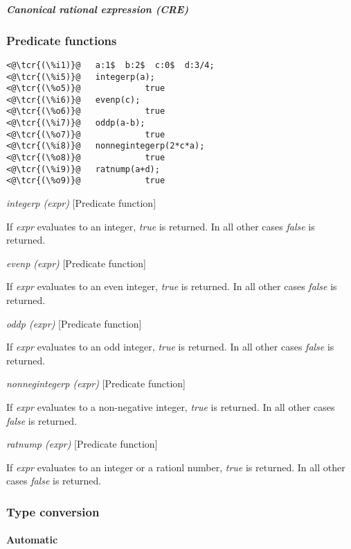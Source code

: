 \documentclass[../Maxima_Workbook.tex]{subfiles}
\begin{document}
\subparagraph{Canonical rational expression (CRE)} \mbox{}



\subsubsection{Predicate functions}

\begin{lstlisting}
<@\tcr{(\%i1)}@   a:1$  b:2$  c:0$  d:3/4;
<@\tcr{(\%i5)}@   integerp(a);
<@\tcr{(\%o5)}@				true
<@\tcr{(\%i6)}@   evenp(c);
<@\tcr{(\%o6)}@				true
<@\tcr{(\%i7)}@   oddp(a-b);
<@\tcr{(\%o7)}@				true
<@\tcr{(\%i8)}@   nonnegintegerp(2*c*a);
<@\tcr{(\%o8)}@				true
<@\tcr{(\%i9)}@   ratnump(a+d);
<@\tcr{(\%o9)}@				true
\end{lstlisting}

\lz \emph{integerp (expr)} \hfill [Predicate function]

\lz If \emph{expr} evaluates to an integer, \emph{true} is returned. In all other cases \emph{false} is returned.

\lzz \emph{evenp (expr)} \hfill [Predicate function]

\lz If \emph{expr} evaluates to an even integer, \emph{true} is returned. In all other cases \emph{false} is returned.

\lzz \emph{oddp (expr)} \hfill [Predicate function]

\lz If \emph{expr} evaluates to an odd integer, \emph{true} is returned. In all other cases \emph{false} is returned.

\lzz \emph{nonnegintegerp (expr)} \hfill [Predicate function]

\lz If \emph{expr} evaluates to a non-negative integer, \emph{true} is returned. In all other cases \emph{false} is returned.

\lzz \emph{ratnump (expr)} \hfill [Predicate function]

\lz If \emph{expr} evaluates to an integer or a rationl number, \emph{true} is returned. In all other cases \emph{false} is returned.

\lzz \subsubsection{Type conversion}

\paragraph{Automatic} \mbox{}
\end{document}
